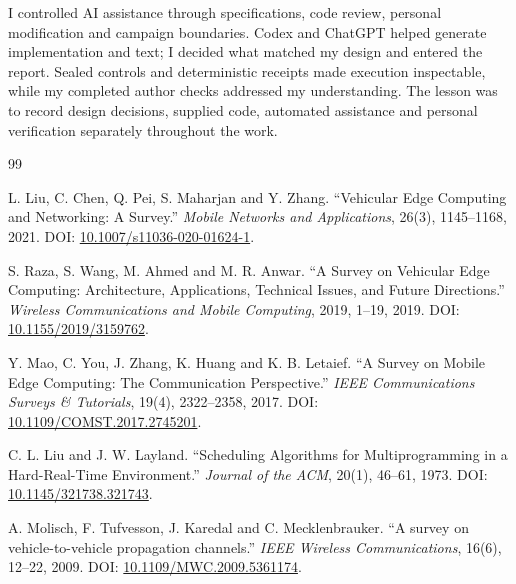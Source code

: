 \documentclass[12pt,a4paper]{article}
\begin{document}
I controlled AI assistance through specifications, code review, personal modification and campaign boundaries. Codex and ChatGPT helped generate implementation and text; I decided what matched my design and entered the report. Sealed controls and deterministic receipts made execution inspectable, while my completed author checks addressed my understanding. The lesson was to record design decisions, supplied code, automated assistance and personal verification separately throughout the work.

\FloatBarrier\singlespacing{}\begin{thebibliography}{99}

 L. Liu, C. Chen, Q. Pei, S. Maharjan and Y. Zhang. ``Vehicular Edge Computing and Networking: A Survey.'' \emph{Mobile Networks and Applications}, 26(3), 1145--1168, 2021. DOI: \href{\detokenize{https://doi.org/10.1007/s11036-020-01624-1}}{10.1007/s11036-020-01624-1}.

 S. Raza, S. Wang, M. Ahmed and M. R. Anwar. ``A Survey on Vehicular Edge Computing: Architecture, Applications, Technical Issues, and Future Directions.'' \emph{Wireless Communications and Mobile Computing}, 2019, 1--19, 2019. DOI: \href{\detokenize{https://doi.org/10.1155/2019/3159762}}{10.1155/2019/3159762}.

 Y. Mao, C. You, J. Zhang, K. Huang and K. B. Letaief. ``A Survey on Mobile Edge Computing: The Communication Perspective.'' \emph{IEEE Communications Surveys \& Tutorials}, 19(4), 2322--2358, 2017. DOI: \href{\detokenize{https://arxiv.org/abs/1701.01090}}{10.1109/COMST.2017.2745201}.

 C. L. Liu and J. W. Layland. ``Scheduling Algorithms for Multiprogramming in a Hard-Real-Time Environment.'' \emph{Journal of the ACM}, 20(1), 46--61, 1973. DOI: \href{\detokenize{https://doi.org/10.1145/321738.321743}}{10.1145/321738.321743}.

 A. Molisch, F. Tufvesson, J. Karedal and C. Mecklenbrauker. ``A survey on vehicle-to-vehicle propagation channels.'' \emph{IEEE Wireless Communications}, 16(6), 12--22, 2009. DOI: \href{\detokenize{https://doi.org/10.1109/MWC.2009.5361174}}{10.1109/MWC.2009.5361174}.


\end{thebibliography}
\end{document}
